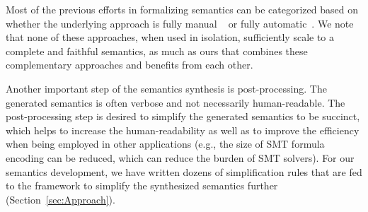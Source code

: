 
%
%

Most of the previous efforts in formalizing \ISA semantics can be categorized based on whether the underlying approach is fully manual ~\cite{Goel:FMCAD14, TSL:TOPLAS13, Leroy:2009, sail-x86} or fully automatic~\cite{Heule2016a, Roessle:CPP19, Hasabnis:ASPLOS16, Hasabnis:FSE16}. We note that none of these approaches, when used in isolation, sufficiently scale to a complete and faithful semantics, as much as ours that combines these complementary approaches and benefits from each other.

Another important step of the semantics synthesis is post-processing. The generated semantics is often verbose and not necessarily human-readable. The post-processing step is desired to simplify the generated semantics to be succinct, which helps to increase the human-readability as well as to improve the efficiency when being employed in other applications (e.g., the size of SMT formula encoding can be reduced, which can reduce the burden of SMT solvers). For our semantics development, we have written dozens of simplification rules that are fed to the \K framework to simplify the synthesized semantics further (Section~\ref{sec:Approach}). 

